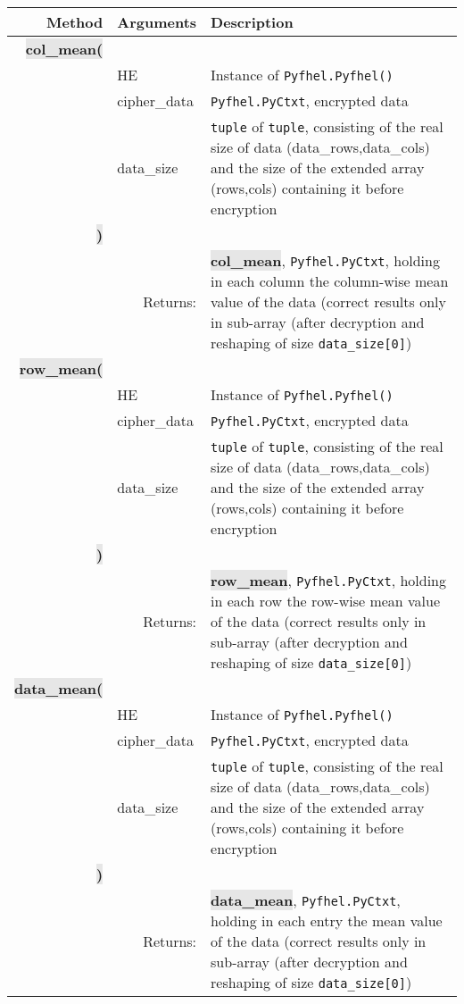 \documentclass[a4paper]{article}
\newcommand{\python}[1]{\texttt{#1}}
\newcommand{\pymethod}[1]{{\ttfamily\colorbox[HTML]{e6e6e6}{\color[HTML]{0066ba}\textbf{\small #1}}}}
\newcommand{\pyreturn}[1]{{\ttfamily\colorbox[HTML]{e6e6e6}{\color[HTML]{ba0066}\textbf{\small #1}}}}
\begin{document}
\begin{tabular}{r|p{3cm}|p{8cm}}
Method&Arguments&Description\\
\hline
\pymethod{col\_mean(}&&\\
&HE&Instance of \python{Pyfhel.Pyfhel()}\\
&cipher\_data&\python{Pyfhel.PyCtxt}, encrypted data\\
&data\_size&\python{tuple} of \python{tuple}, consisting of the real size of data (data\_rows,data\_cols) and the size of the extended array (rows,cols) containing it before encryption\\
\pymethod{)}&&\\
&\multicolumn{1}{r|}{Returns:}&\pyreturn{col\_mean}, \python{Pyfhel.PyCtxt}, holding in each column the column-wise mean value of the data (correct results only in sub-array (after decryption and reshaping of size \python{data_size[0]})\\
\hline
\pymethod{row\_mean(}&&\\
&HE&Instance of \python{Pyfhel.Pyfhel()}\\
&cipher\_data&\python{Pyfhel.PyCtxt}, encrypted data\\
&data\_size&\python{tuple} of \python{tuple}, consisting of the real size of data (data\_rows,data\_cols) and the size of the extended array (rows,cols) containing it before encryption\\
\pymethod{)}&&\\
&\multicolumn{1}{r|}{Returns:}&\pyreturn{row\_mean}, \python{Pyfhel.PyCtxt}, holding in each row the row-wise mean value of the data (correct results only in sub-array (after decryption and reshaping of size \python{data_size[0]})\\
\hline
\pymethod{data\_mean(}&&\\
&HE&Instance of \python{Pyfhel.Pyfhel()}\\
&cipher\_data&\python{Pyfhel.PyCtxt}, encrypted data\\
&data\_size&\python{tuple} of \python{tuple}, consisting of the real size of data (data\_rows,data\_cols) and the size of the extended array (rows,cols) containing it before encryption\\
\pymethod{)}&&\\
&\multicolumn{1}{r|}{Returns:}&\pyreturn{data\_mean}, \python{Pyfhel.PyCtxt}, holding in each entry the mean value of the data (correct results only in sub-array (after decryption and reshaping of size \python{data_size[0]})\\
\end{tabular}\\
\end{document}
